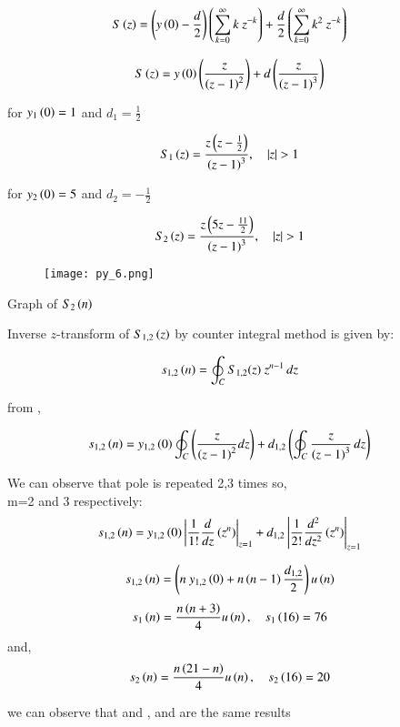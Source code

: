 \documentclass[beamer]{IEEEtran}
\theoremstyle{remark}
\begin{document}
\begin{align}
\label{q17}
    S\brak{z}&=\brak{y\brak{0}-\frac{d}{2}}\left(\sum_{k=0}^{\infty}k\ z^{-k}\right)+\frac{d}{2}\left(\sum_{k=0}^{\infty}k^2\ z^{-k}\right)
\end{align}

\begin{align}
\label{w1}
S\left(z\right)&=y\left(0\right)\left(\frac{z}{\left(z-1\right)^2}\right)+d\left(\frac{z}{\left(z-1\right)^3}\right)
\end{align}

for $y_1\left(0\right)=1$ and $d_1=\frac{1}{2}$

\begin{align}
S_1\brak{z}&=\frac{z\brak{z-\frac{1}{2}}}{\brak{z-1}^3},\quad |z|>1
\end{align}



for $y_2\left(0\right)=5$ and $d_2=-\frac{1}{2}$

\begin{align}S_2\brak{z}&=\frac{z\brak{5z-\frac{11}{2}}}{\brak{z-1}^3},\quad |z|>1\end{align}

\begin{figure}[h]
    \centering
    \texttt{[image: py\_6.png]}
    \label{s2n}
\end{figure}

\begin{center}
Graph of $S_2\left(n\right)$
\end{center}

Inverse $z$-transform of $S_{1,2}\left(z\right)$ by counter integral method is given by:

\begin{align}
s_{1,2}\left(n\right)&=\oint_C S_{1,2}(z)\ z^{n-1}\, dz
\end{align}

from \brak{\ref{w1}},

\begin{align}
    s_{1,2}\left(n\right)&=y_{1,2}\left(0\right)\oint_C \left(\frac{z}{\left(z-1\right)^2}dz\right) + d_{1,2}\left(\oint_C  \frac{z}{\left(z-1\right)^3} \, dz\right)
\end{align}

We can observe that pole is repeated 2,3 times so,\\m=2 and 3 respectively:
\begin{align}
    s_{1,2}\left(n\right)&=y_{1,2}\left(0\right)\left|\frac{1}{1!}\frac{d}{dz}\left(z^n\right)\right|_{z=1} + d_{1,2}\left|\frac{1}{2!}\frac{d^2}{dz^2}\left(z^n\right)\right|_{z=1}
\end{align}

\begin{align}
    s_{1,2}\left(n\right)&=\left(n\ y_{1,2}\left(0\right) + n\left(n-1\right)\frac{d_{1,2}}{2}\right)u\left(n\right)
\end{align}
\begin{align}
\label{39}
    s_1\left(n\right)&=\frac{n\left(n+3\right)}{4}u\left(n\right),\quad s_1\left(16\right)=76
\end{align}
and,
\begin{align}
\label{40}
    s_2\left(n\right)&=\frac{n\left(21-n\right)}{4}u\left(n\right),\quad s_2\left(16\right)=20
\end{align}

we can observe that \brak{\ref{11}} and \brak{\ref{39}},\brak{\ref{12}} and \brak{\ref{40}} are the same results
\end{document}
